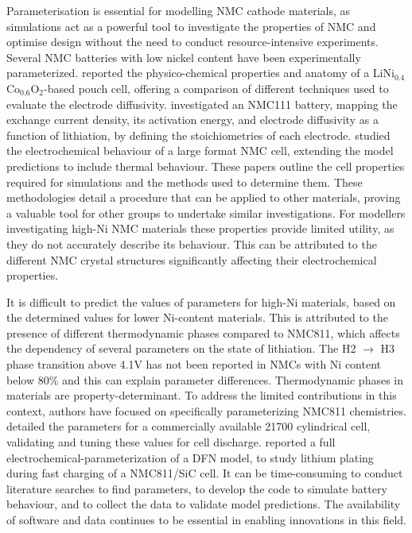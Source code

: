 \documentclass[journal=jacsat,manuscript=article]{achemso}
\begin{document}
Parameterisation is essential for modelling NMC cathode materials, as simulations act as a powerful tool to investigate the properties of NMC and optimise design without the need to conduct resource-intensive experiments.\cite{shearing_2020_3D} 
Several NMC batteries with low nickel content have been experimentally parameterized.\cite{Ecker2015,Schmalstieg_Rahe_Ecker_Sauer_2018,Liebig_2019}
\citeauthor{Ecker2015} reported the physico-chemical properties and anatomy of a LiNi$_{0.4}$Co$_{0.6}$O$_2$-based pouch cell, offering a comparison of different techniques used to evaluate the electrode diffusivity.\cite{Ecker2015} \citeauthor{Schmalstieg_Rahe_Ecker_Sauer_2018} investigated an NMC111 battery, mapping the exchange current density, its activation energy, and electrode diffusivity as a function of lithiation, by defining the stoichiometries of each electrode.\cite{Schmalstieg_Rahe_Ecker_Sauer_2018} 
\citeauthor{Liebig_2019} studied the electrochemical behaviour of a large format NMC cell, extending the model predictions to include thermal behaviour.\cite{Liebig_2019} 
These papers outline the cell properties required for simulations and the methods used to determine them.
These methodologies detail a procedure that can be applied to other materials, proving a valuable tool for other groups to undertake similar investigations. 
For modellers investigating high-Ni NMC materials these properties provide limited utility, as they do not accurately describe its behaviour. 
This can be attributed to the different NMC crystal structures significantly affecting their electrochemical properties.\cite{noh2013comparison} 

It is difficult to predict the values of parameters for high-Ni materials, based on the determined values for lower Ni-content materials.\cite{Amin_Chiang_2016} 
This is attributed to the presence of different thermodynamic phases compared to NMC811, which affects the dependency of several parameters on the state of lithiation. 
The H2 $\rightarrow$ H3 phase transition above 4.1V has not been reported in NMCs with Ni content below 80\% and this can explain parameter differences.\cite{jung2017oxygen} 
Thermodynamic phases in materials are property-determinant.
To address the limited contributions in this context, authors have focused on specifically parameterizing NMC811 chemistries. 
\citeauthor{Chen2020} detailed the parameters for a commercially available 21700 cylindrical cell, validating and tuning these values for cell discharge.\cite{Chen2020} 
\citeauthor{Sturm2019} reported a full electrochemical-parameterization of a DFN model, to study lithium plating during fast charging of a NMC811/SiC cell.\cite{Sturm2019b,Sturm2019} 
It can be time-consuming to conduct literature searches to find parameters, to develop the code to simulate battery behaviour, and to collect the data to validate model predictions. 
The availability of software and data continues to be essential in enabling innovations in this field.
\end{document}
